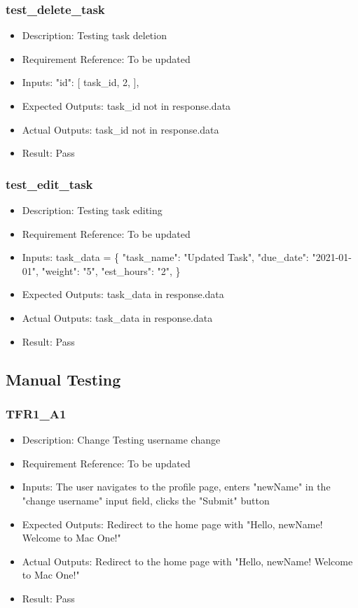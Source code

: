 \documentclass[12pt, titlepage]{article}
\begin{document}
\subsubsection{test\_delete\_task}\label{3.1.16}
\begin{itemize}
    \item Description: Testing task deletion 
    \item Requirement Reference: To be updated
    \item Inputs:  "id": [
                task\_id,
                2,
            ], 
    \item Expected Outputs: task\_id not in response.data
    \item Actual Outputs: task\_id not in response.data
    \item Result: Pass
\end{itemize}

\subsubsection{test\_edit\_task}\label{3.1.17}
\begin{itemize}
    \item Description: Testing task editing 
    \item Requirement Reference: To be updated
    \item Inputs:  task\_data = \{
        "task\_name": "Updated Task",
        "due\_date": "2021-01-01",
        "weight": "5",
        "est\_hours": "2",
    \}
    \item Expected Outputs: task\_data in response.data
    \item Actual Outputs: task\_data in response.data
    \item Result: Pass
\end{itemize}


\subsection{Manual Testing}
\subsubsection{TFR1\_A1}\label{3.2.1}
\begin{itemize}
    \item Description: Change Testing username change
    \item Requirement Reference: To be updated
    \item Inputs: The user navigates to the profile page, enters "newName" in the "change username" input field, clicks the "Submit" button
    \item Expected Outputs: Redirect to the home page with "Hello, newName! Welcome to Mac One!"
    \item Actual Outputs: Redirect to the home page with "Hello, newName! Welcome to Mac One!"
    \item Result: Pass
\end{itemize}
\end{document}
